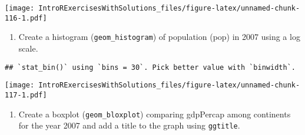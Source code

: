 \documentclass[]{article}
\newenvironment{Shaded}{\begin{snugshade}}{\end{snugshade}}
\newcommand{\KeywordTok}[1]{\textcolor[rgb]{0.13,0.29,0.53}{\textbf{#1}}}
\newcommand{\DataTypeTok}[1]{\textcolor[rgb]{0.13,0.29,0.53}{#1}}
\newcommand{\DecValTok}[1]{\textcolor[rgb]{0.00,0.00,0.81}{#1}}
\newcommand{\StringTok}[1]{\textcolor[rgb]{0.31,0.60,0.02}{#1}}
\newcommand{\OperatorTok}[1]{\textcolor[rgb]{0.81,0.36,0.00}{\textbf{#1}}}
\newcommand{\NormalTok}[1]{#1}
\providecommand{\tightlist}{%
  \setlength{\itemsep}{0pt}\setlength{\parskip}{0pt}}
\begin{document}
\texttt{[image: IntroRExercisesWithSolutions\_files/figure-latex/unnamed-chunk-116-1.pdf]}

\begin{enumerate}
\def\labelenumi{\arabic{enumi}.}
\setcounter{enumi}{11}
\tightlist
\item
  Create a histogram (\texttt{geom\_histogram}) of population (pop) in
  2007 using a log scale.
\end{enumerate}

\begin{Shaded}
\end{Shaded}

\begin{verbatim}
## `stat_bin()` using `bins = 30`. Pick better value with `binwidth`.
\end{verbatim}

\texttt{[image: IntroRExercisesWithSolutions\_files/figure-latex/unnamed-chunk-117-1.pdf]}

\begin{enumerate}
\def\labelenumi{\arabic{enumi}.}
\setcounter{enumi}{12}
\tightlist
\item
  Create a boxplot (\texttt{geom\_bloxplot}) comparing gdpPercap among
  continents for the year 2007 and add a title to the graph using
  \texttt{ggtitle}.
\end{enumerate}

\begin{Shaded}
\end{Shaded}
\end{document}
